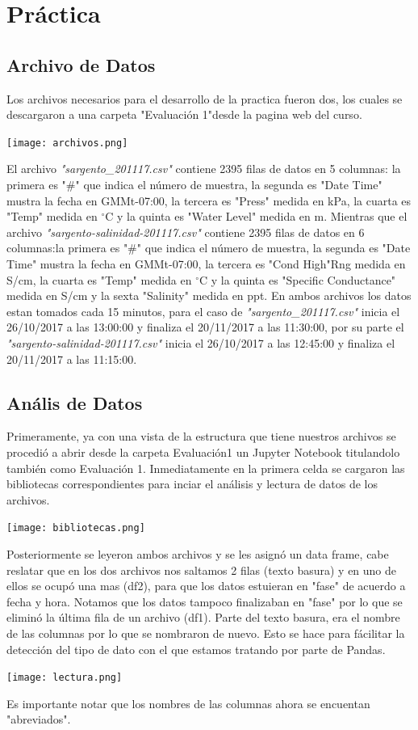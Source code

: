 \documentclass[12pt]{article}
\begin{document}
\section*{Práctica}

\subsection*{Archivo de Datos}
Los archivos necesarios para el desarrollo de la practica fueron dos, los cuales se descargaron a una carpeta "Evaluación 1"desde la pagina web del curso.
\begin{center}
	\texttt{[image: archivos.png]}
\end{center}
El archivo \textit{"sargento\_201117.csv"} contiene 2395 filas de datos en 5 columnas: la primera es "\#" que indica el número de muestra, la segunda es "Date Time" mustra la fecha en GMMt-07:00, la tercera es "Press" medida en kPa, la cuarta es "Temp" medida en $^{\circ}$C y la quinta es "Water Level" medida en m. Mientras que el archivo \textit{"sargento-salinidad-201117.csv"} contiene 2395 filas de datos en 6 columnas:la primera es "\#" que indica el número de muestra, la segunda es "Date Time" mustra la fecha en GMMt-07:00, la tercera es "Cond High"Rng medida en S/cm, la cuarta es "Temp" medida en $^{\circ}$C y la quinta es "Specific Conductance" medida en S/cm y la sexta "Salinity" medida en ppt. En ambos archivos los datos estan tomados cada 15 minutos, para el caso de \textit{"sargento\_201117.csv"} inicia el 26/10/2017 a las 13:00:00 y finaliza el 20/11/2017 a las 11:30:00, por su parte el \textit{"sargento-salinidad-201117.csv"} inicia el 26/10/2017 a las 12:45:00 y finaliza el 20/11/2017 a las 11:15:00.

\subsection*{Anális de Datos}
Primeramente, ya con una vista de la estructura que tiene nuestros archivos se procedió a abrir desde la carpeta Evaluación1 un Jupyter Notebook titulandolo también como Evaluación 1. Inmediatamente en la primera celda se cargaron las bibliotecas correspondientes para inciar el análisis y lectura de datos de los archivos.
\begin{center}
	\texttt{[image: bibliotecas.png]}
\end{center}
Posteriormente se leyeron ambos archivos y se les asignó un data frame, cabe reslatar que en los dos archivos nos saltamos 2 filas (texto basura) y en uno de ellos se ocupó una mas (df2), para que los datos estuieran en "fase" de acuerdo a fecha y hora. Notamos que los datos tampoco finalizaban en "fase" por lo que se eliminó la última fila de un archivo (df1). Parte del texto basura, era el nombre de las columnas por lo que se nombraron de nuevo. Esto se hace para fácilitar la detección del tipo de dato con el que estamos tratando por parte de Pandas.
\begin{center}
	\texttt{[image: lectura.png]}
\end{center}
Es importante notar que los nombres de las columnas ahora se encuentan "abreviados".\\
\end{document}
